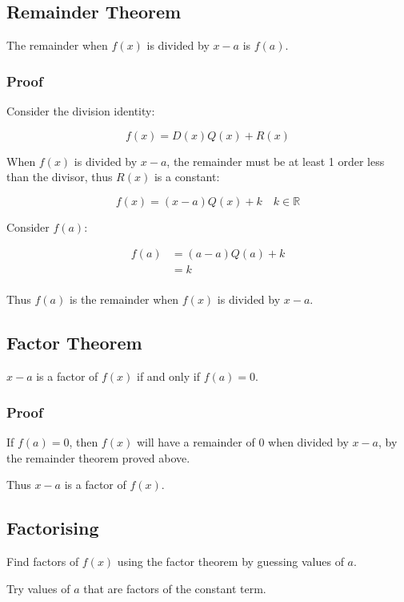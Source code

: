 \documentclass[a4paper,11pt]{article}
\begin{document}
\subsection{Remainder Theorem}

The remainder when $f(x)$ is divided by $x - a$ is $f(a)$.


\subsubsection{Proof}

Consider the division identity:

$$
f(x) = D(x) Q(x) + R(x)
$$

When $f(x)$ is divided by $x - a$, the remainder must be at least 1 order less
than the divisor, thus $R(x)$ is a constant:

$$
f(x) = (x - a) Q(x) + k \quad k \in \mathbb{R}
$$

Consider $f(a)$:

$$
\begin{aligned}
f(a) & = (a - a) Q(a) + k \\
& = k \\
\end{aligned}
$$

Thus $f(a)$ is the remainder when $f(x)$ is divided by $x - a$.


\subsection{Factor Theorem}

$x - a$ is a factor of $f(x)$ if and only if $f(a) = 0$.


\subsubsection{Proof}

If $f(a) = 0$, then $f(x)$ will have a remainder of 0 when divided by $x - a$,
by the remainder theorem proved above.

Thus $x - a$ is a factor of $f(x)$.


\subsection{Factorising}

Find factors of $f(x)$ using the factor theorem by guessing values of $a$.

Try values of $a$ that are factors of the constant term.
\end{document}
